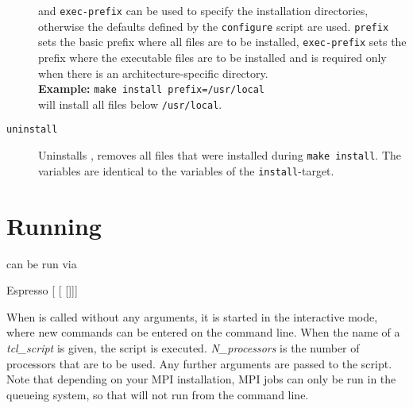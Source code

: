\begin{description}
  and \texttt{exec-prefix} can be used to specify the installation
  directories, otherwise the defaults defined by the
  \texttt{configure} script are used. \texttt{prefix} sets the basic
  prefix where all \es{} files are to be installed,
  \texttt{exec-prefix} sets the prefix where the executable files are
  to be installed and is required only when there is an
  architecture-specific directory.\\
  \textbf{Example:} \verb!make install prefix=/usr/local!\\
  will install all files below \texttt{/usr/local}.
\item[\texttt{uninstall}] Uninstalls \es{}, \ie{} removes all files
  that were installed during \texttt{make install}. The variables are
  identical to the variables of the \texttt{install}-target.
\end{description}

\section{Running \es}
\label{sec:run}

\es{} can be run via
\begin{code}
Espresso [ [ []]]
\end{code}

 When \es{} is called without any arguments,
it is started in the interactive mode, where new commands can be
entered on the command line. When the name of a \textit{tcl\_script}
is given, the script is executed. \textit{N\_processors} is the number
of processors that are to be used. Any further arguments are passed to
the script. Note that depending on your MPI installation, MPI jobs can
only be run in the queueing system, so that \es{} will not run from
the command line.

